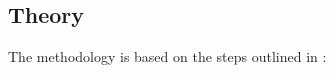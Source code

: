 \subsection{Theory}
\label{sec:theory}
The methodology is based on the steps outlined in \parencite{cramer88}:

